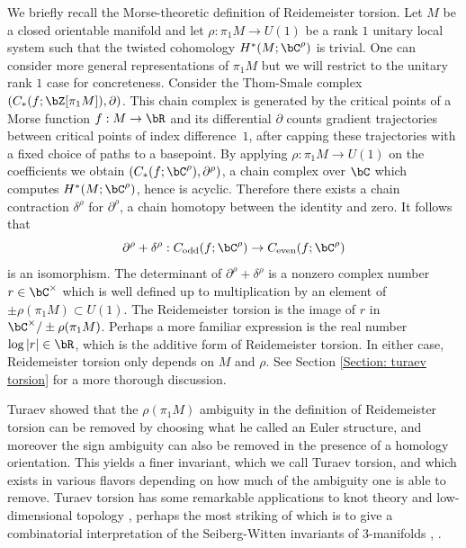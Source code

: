 We briefly recall the Morse-theoretic definition of Reidemeister torsion. Let $M$ be a closed orientable manifold and let $\rho:\pi_1M \to U(1)$ be a rank $1$ unitary local system such that the twisted cohomology $H^*(M;\bC^\rho)$ is trivial. One can consider more general representations of $\pi_1M$ but we will restrict to the unitary rank $1$ case for concreteness. Consider the Thom-Smale complex $(C_*(f ; \bZ[\pi_1M]), \partial)$. This chain complex is generated by the critical points of a Morse function $f:M \to \bR$ and its differential $\partial$ counts gradient trajectories between critical points of index difference~$1$, after capping these trajectories with a fixed choice of paths to a basepoint. By applying $\rho:\pi_1M \to U(1)$ on the coefficients we obtain $(C_*(f;\bC^\rho), \partial^\rho)$, a chain complex over $\bC$ which computes $H^*(M; \bC^\rho)$, hence is acyclic. Therefore there exists a chain contraction $\delta^\rho$ for $\partial^\rho$, \ie a chain homotopy between the identity and zero. It follows that
\[
\partial^\rho+ \delta^\rho: C_{\text{odd}}(f;\bC^\rho) \to C_{\text{even}}(f;\bC^\rho)
\]
is an isomorphism. The determinant of $\partial^\rho+\delta^\rho$ is a nonzero complex number $r \in \bC^\times$ which is well defined up to multiplication by an element of $\pm \rho( \pi_1M) \subset U(1)$. The Reidemeister torsion is the image of $r$ in $\bC^\times / \pm \rho( \pi_1M)$. Perhaps a more familiar expression is the real number $\log | r | \in \bR$, which is the additive form of Reidemeister torsion. In either case, Reidemeister torsion only depends on $M$ and $\rho$. See Section \ref{Section: turaev torsion} for a more thorough discussion.

Turaev showed that the $\rho(\pi_1M)$ ambiguity in the definition of Reidemeister torsion can be removed by choosing what he called an Euler structure, and moreover the sign ambiguity can also be removed in the presence of a homology orientation. This yields a finer invariant, which we call Turaev torsion, and which exists in various flavors depending on how much of the ambiguity one is able to remove. Turaev torsion has some remarkable applications to knot theory and low-dimensional topology \cite{T86}, perhaps the most striking of which is to give a combinatorial interpretation of the Seiberg-Witten invariants of 3-manifolds \cite{MT96}, \cite{T98}.

